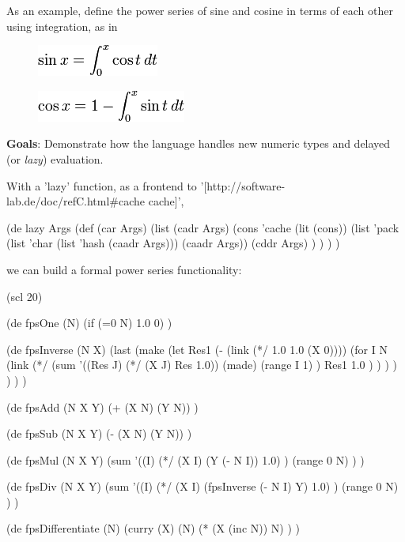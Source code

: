 As an example, define the power series of sine and cosine in terms of
each other using integration, as in

\begin{figure}[htbp]
\centering
\includegraphics[scale=.6]{graphics/57270a0aaa24e849c7139b71fc5a2879.png}
\end{figure}

\begin{figure}[htbp]
\centering
\includegraphics[scale=.6]{graphics/a9aea137ca2037a12d1cf6b4db76aa23.png}
\end{figure}

\textbf{Goals}: Demonstrate how the language handles new numeric types
and delayed (or \emph{lazy}) evaluation.

\begin{wideverbatim}

With a 'lazy' function, as a frontend to
'[http://software-lab.de/doc/refC.html#cache cache]',

(de lazy Args
   (def (car Args)
      (list (cadr Args)
         (cons 'cache (lit (cons))
            (list 'pack (list 'char (list 'hash (caadr Args))) (caadr Args))
            (cddr Args) ) ) ) )

we can build a formal power series functionality:

(scl 20)

(de fpsOne (N)
   (if (=0 N) 1.0 0) )

(de fpsInverse (N X)
   (last
      (make
         (let Res1 (- (link (*/ 1.0 1.0 (X 0))))
            (for I N
               (link
                  (*/
                     (sum '((Res J) (*/ (X J) Res 1.0))
                        (made)
                        (range I 1) )
                     Res1
                     1.0 ) ) ) ) ) ) )

(de fpsAdd (N X Y)
   (+ (X N) (Y N)) )

(de fpsSub (N X Y)
   (- (X N) (Y N)) )

(de fpsMul (N X Y)
   (sum
      '((I)
         (*/ (X I) (Y (- N I)) 1.0) )
      (range 0 N) ) )

(de fpsDiv (N X Y)
   (sum
      '((I)
         (*/ (X I) (fpsInverse (- N I) Y) 1.0) )
      (range 0 N) ) )

(de fpsDifferentiate (N)
   (curry (X) (N)
      (* (X (inc N)) N) ) )

\end{wideverbatim}


